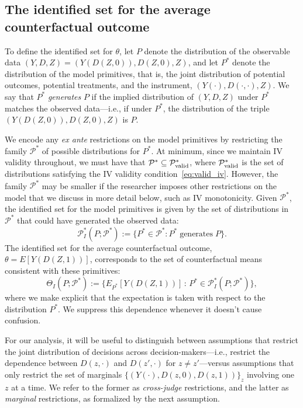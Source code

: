 \documentclass[12pt]{article}%
\theoremstyle{definition}
\newcommand\1{\operatorname{I}\indicatorfence}
\begin{document}
\subsection{The identified set for the average counterfactual outcome}

To define the identified set for $\theta$, let $P$ denote the distribution of
the observable data $(Y, D, Z)=(Y(D(Z,0)), D(Z,0), Z)$, and let $P^{*}$ denote the
distribution of the model primitives, that is, the joint distribution of
potential outcomes, potential treatments, and the instrument,
$(Y(\cdot), D(\cdot, \cdot), Z)$. We say that $P^*$ \emph{generates} $P$ if the
implied distribution of $(Y, D, Z)$ under $P^*$ matches the observed data---i.e.,
if under $P^*$, the distribution of the triple $(Y(D(Z,0)), D(Z,0), Z)$ is $P$.

We encode any \emph{ex ante} restrictions on the model primitives by restricting
the family $\mathcal{P}^{*}$ of possible distributions for $P^{*}$. At minimum,
since we maintain IV validity throughout, we must have that
$\mathcal{P}^* \subseteq \mathcal{P}^{*}_{\textnormal{valid}}$, where
$\mathcal{P}^{*}_{\textnormal{valid}}$ is the set of distributions satisfying
the IV validity condition~\eqref{eq:valid_iv}. However, the
family $\mathcal{P}^{*}$ may be smaller if the researcher imposes other
restrictions on the model that we discuss in more detail below, such as IV
monotonicity. Given $\mathcal{P}^{*}$, the identified set for the model
primitives is given by the set of distributions in $\mathcal{P}^{*}$ that could
have generated the observed data:
\begin{equation*}
\mathcal{P}^*_{I}(P; \mathcal{P}^*) := \{P^* \in \mathcal{P}^*\colon P^*\;\text{generates}\;P \}.
\end{equation*}
The identified set for the average counterfactual outcome,
$\theta = E[Y(D(Z,1))]$, corresponds to the set of counterfactual means
consistent with these primitives:
\begin{equation*}
  \Theta_I(P; \mathcal{P}^*) := \{E_{P^*}[Y(D(Z,1))] \, :\, P^* \in \mathcal{P}^*_{I}(P; \mathcal{P}^*) \},
\end{equation*}
where we make explicit that the expectation is taken with respect to the
distribution $P^{*}$. We suppress this dependence whenever it doesn't cause
confusion.

For our analysis, it will be useful to distinguish between assumptions that
restrict the joint distribution of decisions across decision-makers---i.e.,
restrict the dependence between $D(z, \cdot)$ and $D(z', \cdot)$ for
$z \neq z'$---versus assumptions that only restrict the set of marginals
$\{(Y(\cdot), D(z,0), D(z,1))\}_z$ involving one $z$ at a time. We refer to the
former as \emph{cross-judge} restrictions, and the latter as \emph{marginal}
restrictions, as formalized by the next assumption.
\end{document}
